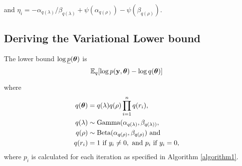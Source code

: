 \documentclass{amsart}[12pt]
\begin{document}
\noindent and $\eta_i = - \alpha_{q(\lambda)}/\beta_{q(\lambda)} + \psi(\alpha_{q(\rho)}) - \psi(\beta_{q(\rho)})$.
%
%
%
%
%
%
%
%
%


\subsection{Deriving the Variational Lower bound}
The lower bound $\log{\underline{p}({\boldsymbol\theta})}$ is
$$
{\mathbb E}_q[\log{p({\bf y}, {\boldsymbol\theta})} - \log{q({\boldsymbol\theta})}]
$$

\noindent where
\begin{align*}
	q({\boldsymbol \theta}) &= q(\lambda) q(\rho) \prod_{i=1}^n q(r_i), \\
	q(\lambda) &\sim \text{Gamma}{(\alpha_{q(\lambda)}, \beta_{q(\lambda))}}, \\
	q(\rho) &\sim \text{Beta}(\alpha_{q(\rho)}, \beta_{q(\rho)}) \text{ and } \\
	q(r_i) &= 1 \text{ if } y_i \ne 0,\text{ and } p_i \text{ if } y_i = 0,
\end{align*}
where $p_i$ is calculated for each iteration as specified in Algorithm \ref{algorithm1}.
\end{document}
